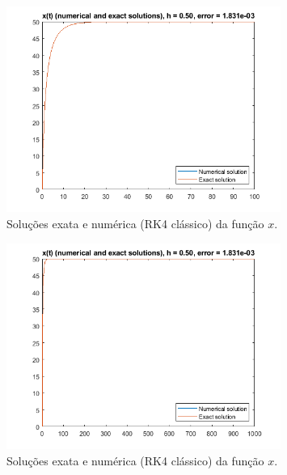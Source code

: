 \documentclass{article}
\begin{document}
\begin{enumerate}
\begin{enumerate}
                        \begin{figure}[!h]
                            \centering
                            \includegraphics[width=0.8\textwidth]{../images/rk_3.png}
                            \caption{Soluções exata e numérica (RK4 clássico)
                            da função $x$.}
                            \label{fig:rk_3}
                        \end{figure}
                
                        \begin{figure}[!h]
                            \centering
                            \includegraphics[width=0.8\textwidth]{../images/rk_4.png}
                            \caption{Soluções exata e numérica (RK4 clássico)
                            da função $x$.}
                            \label{fig:rk_4}
                        \end{figure}

                        \clearpage


\end{enumerate}
\end{enumerate}
\end{document}
